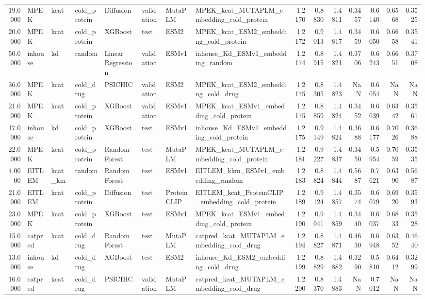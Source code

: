 \begin{tabular}{rlllllllrrrrrrr}
19.0000 & MPEK & kcat & cold_protein & Diffusion & validation & MutaPLM & MPEK_kcat_MUTAPLM_embedding_cold_protein & 1.2170 & 0.8830 & 1.4811 & 0.3457 & 0.6140 & 0.6568 & 0.3525 \\
20.0000 & MPEK & kcat & cold_protein & XGBoost & test & ESM2 & MPEK_kcat_ESM2_embedding_cold_protein & 1.2172 & 0.9013 & 1.4817 & 0.3459 & 0.6050 & 0.6658 & 0.3541 \\
50.0000 & inhouse & kd & random & Linear Regression & validation & ESMv1 & inhouse_Kd_ESMv1_embedding_random & 1.2174 & 0.8915 & 1.4821 & 0.3706 & 0.6243 & 0.6651 & 0.3708 \\
36.0000 & MPEK & kcat & cold_drug & PSICHIC & validation & ESM2 & MPEK_kcat_ESM2_embedding_cold_drug & 1.2175 & 0.8305 & 1.4823 & NaN & 0.6054 & NaN & NaN \\
21.0000 & MPEK & kcat & cold_protein & XGBoost & validation & ESMv1 & MPEK_kcat_ESMv1_embedding_cold_protein & 1.2175 & 0.8859 & 1.4824 & 0.3452 & 0.6039 & 0.6342 & 0.3561 \\
17.0000 & inhouse & kd & cold_protein & XGBoost & test & ESMv1 & inhouse_Kd_ESMv1_embedding_cold_protein & 1.2175 & 0.9149 & 1.4824 & 0.3688 & 0.6177 & 0.7026 & 0.3688 \\
22.0000 & MPEK & kcat & cold_protein & Random Forest & test & MutaPLM & MPEK_kcat_MUTAPLM_embedding_cold_protein & 1.2181 & 0.9227 & 1.4837 & 0.3450 & 0.5954 & 0.7059 & 0.3535 \\
4.0000 & EITLEM & kcat_km & random & Random Forest & test & ESMv1 & EITLEM_kkm_ESMv1_embedding_random & 1.2183 & 0.8824 & 1.4844 & 0.5687 & 0.7621 & 0.6390 & 0.5687 \\
21.0000 & EITLEM & kcat & cold_protein & Diffusion & test & ProteinCLIP & EITLEM_kcat_ProteinCLIP_embedding_cold_protein & 1.2189 & 0.9124 & 1.4857 & 0.3574 & 0.6079 & 0.6920 & 0.3593 \\
23.0000 & MPEK & kcat & cold_protein & XGBoost & test & ESMv1 & MPEK_kcat_ESMv1_embedding_cold_protein & 1.2190 & 0.9041 & 1.4859 & 0.3440 & 0.6037 & 0.6833 & 0.3528 \\
15.0000 & catpred & kcat & cold_drug & Random Forest & test & MutaPLM & catpred_kcat_MUTAPLM_embedding_cold_drug & 1.2194 & 0.8827 & 1.4871 & 0.4630 & 0.6948 & 0.6352 & 0.4640 \\
13.0000 & inhouse & kd & cold_drug & XGBoost & test & ESM2 & inhouse_Kd_ESM2_embedding_cold_drug & 1.2199 & 0.8829 & 1.4882 & 0.3290 & 0.5810 & 0.6412 & 0.3299 \\
16.0000 & catpred & kcat & cold_drug & PSICHIC & validation & MutaPLM & catpred_kcat_MUTAPLM_embedding_cold_drug & 1.2200 & 0.8370 & 1.4883 & NaN & 0.7012 & NaN & NaN \\

\end{tabular}
